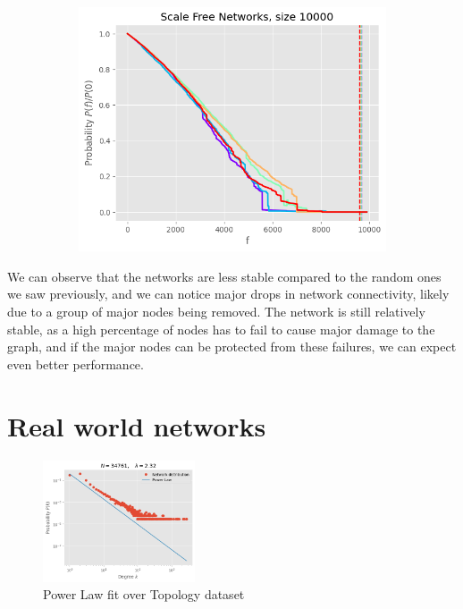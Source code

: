 \documentclass[
]{article}
\begin{document}
\begin{figure}
\begin{subfigure}{0.3\textwidth}
  \end{subfigure}
  \begin{subfigure}{0.3\textwidth}
    \includegraphics{./assets/scalefree_10000_random.png}
  \end{subfigure}
\end{figure}

We can observe that the networks are less stable compared to the random
ones we saw previously, and we can notice major drops in network
connectivity, likely due to a group of major nodes being removed. The
network is still relatively stable, as a high percentage of nodes has to
fail to cause major damage to the graph, and if the major nodes can be
protected from these failures, we can expect even better performance.

\hypertarget{real-world-networks}{%
\section{Real world networks}\label{real-world-networks}}


\begin{figure}
  \centering
  \includegraphics[width=0.4\textwidth]{assets/internet_pl_fit.png}
  \caption{Power Law fit over Topology dataset}
\end{figure}
\end{document}
